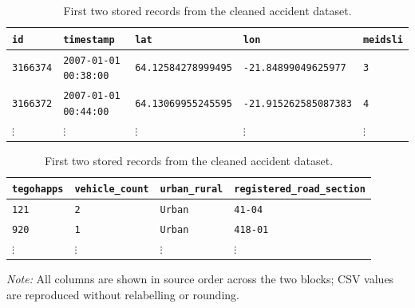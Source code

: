\begin{table}[H]
\centering
\captionsetup{width=\linewidth}
\caption[First two stored records from the cleaned accident dataset.]{First two stored records from the cleaned accident dataset.}
\label{tab:exact-accidents}
\fontsize{11}{14}\selectfont\setlength{\tabcolsep}{4pt}\renewcommand{\arraystretch}{1.2}
\begin{tabular}{lllll}
\toprule
\texttt{id} & \texttt{timestamp} & \texttt{lat} & \texttt{lon} & \texttt{meidsli} \\
\midrule
\texttt{3166374} & \texttt{2007-01-01 00:38:00} & \texttt{64.12584278999495} & \texttt{-21.84899049625977} & \texttt{3} \\
\texttt{3166372} & \texttt{2007-01-01 00:44:00} & \texttt{64.13069955245595} & \texttt{-21.915262585087383} & \texttt{4} \\
$\vdots$ & $\vdots$ & $\vdots$ & $\vdots$ & $\vdots$ \\
\bottomrule
\end{tabular}
\par{}\par\smallskip
\begin{tabular}{llll}
\toprule
\texttt{tegohapps} & \texttt{vehicle\_count} & \texttt{urban\_rural} & \texttt{registered\_road\_section} \\
\midrule
\texttt{121} & \texttt{2} & \texttt{Urban} & \texttt{41-04} \\
\texttt{920} & \texttt{1} & \texttt{Urban} & \texttt{418-01} \\
$\vdots$ & $\vdots$ & $\vdots$ & $\vdots$ \\
\bottomrule
\end{tabular}
\par\smallskip\begin{minipage}{\linewidth}\small
\textit{Note:} All columns are shown in source order across the two blocks; CSV values are reproduced without relabelling or rounding.
\end{minipage}
\end{table}
